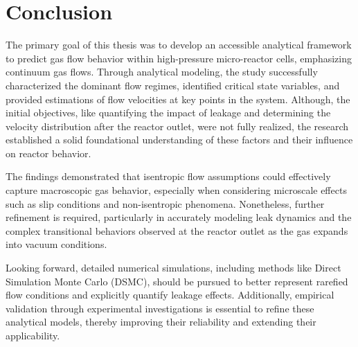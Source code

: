 \section*{Conclusion}
The primary goal of this thesis was to develop an accessible analytical framework to predict gas flow behavior within high-pressure micro-reactor cells, emphasizing continuum gas flows.
Through analytical modeling, the study successfully characterized the dominant flow regimes, identified critical state variables, and provided estimations of flow velocities at key points in the system.
Although, the initial objectives, like quantifying the impact of leakage and determining the velocity distribution after the reactor outlet, were not fully realized, the research established a solid foundational understanding of these factors and their influence on reactor behavior.

The findings demonstrated that isentropic flow assumptions could effectively capture macroscopic gas behavior, especially when considering microscale effects such as slip conditions and non-isentropic phenomena.
Nonetheless, further refinement is required, particularly in accurately modeling leak dynamics and the complex transitional behaviors observed at the reactor outlet as the gas expands into vacuum conditions.

Looking forward, detailed numerical simulations, including methods like Direct Simulation Monte Carlo (DSMC), should be pursued to better represent rarefied flow conditions and explicitly quantify leakage effects.
Additionally, empirical validation through experimental investigations is essential to refine these analytical models, thereby improving their reliability and extending their applicability.
